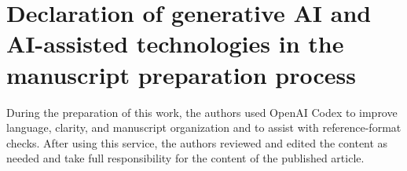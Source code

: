 \documentclass[preprint,12pt]{elsarticle}
\begin{document}
\section*{Declaration of generative AI and AI-assisted technologies in the manuscript preparation process}
During the preparation of this work, the authors used OpenAI Codex to improve language, clarity, and manuscript organization and to assist with reference-format checks. After using this service, the authors reviewed and edited the content as needed and take full responsibility for the content of the published article.



\end{document}
